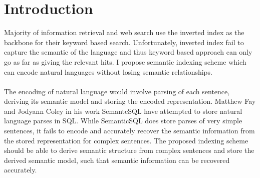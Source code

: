 \documentclass[10pt]{article}
\begin{document}
 

\section{Introduction}
Majority of information retrieval and web search use the inverted index as the backbone for their keyword based search. Unfortunately, inverted index fail to capture the semantic of the language and thus keyword based approach can only go as far as giving the relevant hits. I propose semantic indexing scheme which can encode natural languages without losing semantic relationships.
 \\
 \\
The encoding of natural language would involve parsing of each sentence, deriving its semantic model and storing the encoded representation. Matthew Fay and Jodyann Coley in his work SemantcSQL have attempted to store natural language parses in SQL. While SemanticSQL does store parses of very simple sentences, it fails to encode and accurately recover the semantic information from the stored representation for complex sentences. The proposed indexing scheme should be able to derive semantic structure from complex sentences and store the derived semantic model, such that semantic information can be recovered accurately. 
\end{document}
